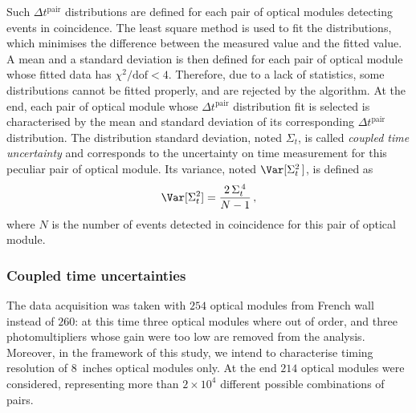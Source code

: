 Such  $\Delta t^{\text{pair}}$ distributions are defined for each pair of optical modules detecting events in coincidence.
The least square method is used to fit the distributions, which minimises the difference between the measured value and the fitted value.
A mean and a standard deviation is then defined for each pair of optical module whose fitted data has $\chi^{2}/\text{dof}<4$.
Therefore, due to a lack of statistics, some distributions cannot be fitted properly, and are rejected by the algorithm.
At the end, each pair of optical module whose $\Delta t^{\text{pair}}$ distribution fit is selected is characterised by the mean and standard deviation of its corresponding $\Delta t^{\text{pair}}$ distribution.
The distribution standard deviation, noted $\Sigma_{t}$, is called \emph{coupled time uncertainty} and corresponds to the uncertainty on time measurement for this peculiar pair of optical module.
Its variance, noted $\Var[\Sigma_{t}^{2}\,]$, is defined as
\begin{equation}
  \Var[\Sigma_{t}^{2}] = \frac{2\,\Sigma_{t}^{\,4}}{N-1}\,,
  \label{eq:var_sigma_pair}
\end{equation}
where $N$ is the number of events detected in coincidence for this pair of optical module.

\subsubsection*{Coupled time uncertainties}

The data acquisition was taken with $254$ optical modules from French wall instead of $260$: at this time three optical modules where out of order, and three photomultipliers whose gain were too low are removed from the analysis.
Moreover, in the framework of this study, we intend to characterise timing resolution of $8$~inches optical modules only.
At the end $214$ optical modules were considered, representing more than ${2\times10^{4}}$ different possible combinations of pairs.


